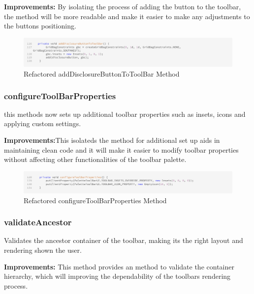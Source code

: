 \textbf{Improvements:} By isolating the process of adding the button to the toolbar,
the method will be more readable and make it easier to make any adjustments to the buttons positioning.

\begin{figure}[H]
    \centering
    \includegraphics[width=\linewidth]{pic/F addDisclosureButtonToToolBar.png}
    \caption{Refactored addDisclosureButtonToToolBar Method}
    \label{fig:Refactored addDisclosureButtonToToolBar Method}
\end{figure}



\subsubsection{configureToolBarProperties}
this methods now sets up additional toolbar properties such as insets, icons and applying custom settings.

\textbf{Improvements:}This isolateds the method for additional set up aids in maintaining clean code and it will make
it easier to modify toolbar properties without affecting other functionalities of the toolbar palette.

\begin{figure}[H]
    \centering
    \includegraphics[width=\linewidth]{pic/F configureToolBarProperties.png}
    \caption{Refactored configureToolBarProperties Method}
    \label{fig:Refactored configureToolBarProperties Method}
\end{figure}





\subsubsection{validateAncestor}
Validates the ancestor container of the toolbar, making its the right layout and rendering shown the user.

\textbf{Improvements:} This method provides an method to validate the container hierarchy, which will
improving the dependability of the toolbars rendering process.

